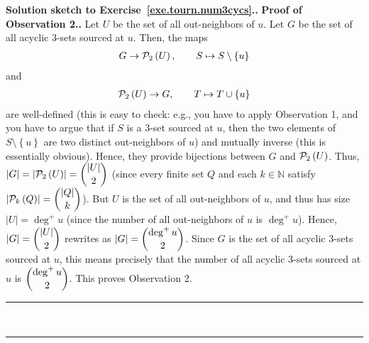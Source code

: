 \documentclass[numbers=enddot,12pt,final,onecolumn,notitlepage]{scrartcl}%
\theoremstyle{definition}
\newenvironment{proof}[1][Proof]{\noindent\textbf{#1.} }{\ \rule{0.5em}{0.5em}}
\newcommand{\NN}{\mathbb{N}}
\newcommand{\powset}[2][]{\ifthenelse{\equal{#2}{}}{\mathcal{P}\left(#1\right)}{\mathcal{P}_{#1}\left(#2\right)}}
\newcommand{\set}[1]{\left\{ #1 \right\}}
\newcommand{\abs}[1]{\left| #1 \right|}
\begin{document}
\begin{proof}[Solution sketch to Exercise~\ref{exe.tourn.num3cycs}.]
\begin{proof}[Proof of Observation 2.]
{Let $U$ be the set of all out-neighbors of $u$. Let $G$ be the set of
all acyclic 3-sets sourced at $u$. Then, the maps
\begin{align*}
G \to \powset[2]{U},
\qquad S \mapsto S \setminus \set{u}
\end{align*}
and
\begin{align*}
\powset[2]{U} \to G,
\qquad T \mapsto T \cup \set{u}
\end{align*}
are well-defined (this is easy to check: e.g., you have to apply
Observation 1, and you have to argue that
if $S$ is a 3-set sourced at $u$, then the two elements of
$S \setminus \set{u}$ are two distinct out-neighbors of $u$) and
mutually inverse (this is essentially obvious). Hence, they provide
bijections between $G$ and $\powset[2]{U}$. Thus,
$\abs{G} = \abs{\powset[2]{U}} = \dbinom{\abs{U}}{2}$ (since every
finite set $Q$ and each $k \in \NN$ satisfy
$\abs{\powset[k]{Q}} = \dbinom{\abs{Q}}{k}$). But $U$ is the set of
all out-neighbors of $u$, and thus has size $\abs{U} = \deg^+ u$
(since the number of all out-neighbors of $u$ is $\deg^+ u$). Hence,
$\abs{G} = \dbinom{\abs{U}}{2}$ rewrites as
$\abs{G} = \dbinom{\deg^+ u}{2}$. Since $G$ is the set of all acyclic
3-sets sourced at $u$, this means precisely that
the number of all acyclic 3-sets sourced at $u$ is
$\dbinom{\deg^+ u}{2}$.} This proves Observation 2.
\end{proof}


\end{proof}
\end{document}
